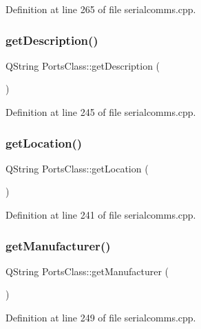 Definition at line 265 of file serialcomms.\+cpp.

\mbox{\label{classPortsClass_aabad7eb750a333dc8e8facb741dd62fa}} 
\subsubsection{\texorpdfstring{getDescription()}{getDescription()}}
{\footnotesize\ttfamily Q\+String Ports\+Class\+::get\+Description (\begin{DoxyParamCaption}{ }\end{DoxyParamCaption})}



Definition at line 245 of file serialcomms.\+cpp.

\mbox{\label{classPortsClass_a2dea26b21dbd7545b9852d8086ce4657}} 
\subsubsection{\texorpdfstring{getLocation()}{getLocation()}}
{\footnotesize\ttfamily Q\+String Ports\+Class\+::get\+Location (\begin{DoxyParamCaption}{ }\end{DoxyParamCaption})}



Definition at line 241 of file serialcomms.\+cpp.

\mbox{\label{classPortsClass_a8a0b3c6b43b97f7a2519942b51cf8db6}} 
\subsubsection{\texorpdfstring{getManufacturer()}{getManufacturer()}}
{\footnotesize\ttfamily Q\+String Ports\+Class\+::get\+Manufacturer (\begin{DoxyParamCaption}{ }\end{DoxyParamCaption})}



Definition at line 249 of file serialcomms.\+cpp.

